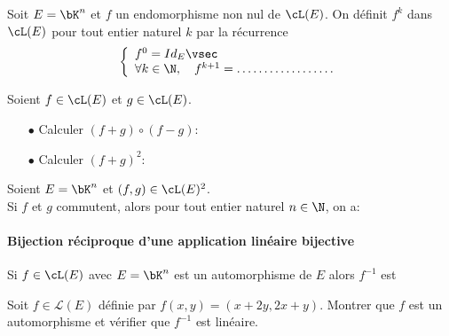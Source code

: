 \documentclass[a4paper, 11pt]{article}
\begin{document}
 {\noindent  

\begin{defi}
Soit $E=\bK^n$ et $f$ un endomorphisme non nul de $\cL(E)$. On d\'efinit $f^k$ dans $\cL(E)$ pour tout entier naturel $k$ par la r\'ecurrence
$$\left\lbrace \begin{array}{l}
f^0=Id_E\vsec\\
\forall k\in\N,\quad f^{k+1}= \ldots \ldots \ldots \ldots \ldots \ldots%
\end{array}\right.$$ 
\end{defi}
 }

\begin{exemples}
Soient $f\in\cL(E)$ et $g\in\cL(E)$. 
\begin{itemize}
 \item[$\bullet$] Calculer $(f+g)\circ (f-g)$:
\vspace{2cm}
\item[$\bullet$]  Calculer $(f+g)^2$:
\vspace{2cm}
\end{itemize}
\end{exemples}

 {\noindent  

\begin{prop}
Soient $E=\bK^n$ et $(f,g)\in\cL(E)^2$.\\
Si $f$ et $g$ commutent, alors pour tout entier naturel $n\in\N$, on a:\\
\vspace{1cm}
\end{prop}
 }


\vspace{0.5cm}

\paragraph{Bijection r\'eciproque d'une application lin\'eaire bijective}


\begin{prop}
Si $f\in\cL(E)$ avec $E=\bK^n$ est un automorphisme de $E$ alors $f^{-1}$ est \dotfill
\end{prop}
 

{\footnotesize \begin{exercice} Soit $f \in \mathcal{L}(E)$ d\'efinie par $f(x,y) = (x+2y, 2x+y)$. Montrer que $f$ est un automorphisme et v\'erifier que $f^{-1}$ est lin\'eaire.
\end{exercice}}
\end{document}
